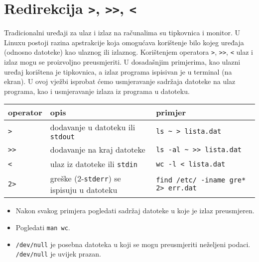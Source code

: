 \section{Redirekcija \lstinline!>!, \lstinline!>>!, \lstinline!<!}


Tradicionalni uređaji za ulaz i izlaz na računalima su tipkovnica i monitor. U Linuxu postoji razina apstrakcije koja omogućava korištenje bilo kojeg uređaja (odnosno datoteke) kao ulaznog ili izlaznog. Korištenjem operatora \lstinline!>!, \lstinline!>>!, \lstinline!<! ulaz i izlaz mogu se proizvoljno preusmjeriti. U dosadašnjim primjerima, kao ulazni uređaj korištena je tipkovnica, a izlaz programa ispisivan je u terminal (na ekran). U ovoj vježbi isprobat ćemo usmjeravanje sadržaja datoteke na ulaz programa, kao i usmjeravanje izlaza iz programa u datoteku.

\begin{tabularx}{\textwidth}{lXl}
\hline
operator & opis & primjer\\
\hline
\lstinline!>! & dodavanje u datoteku ili \texttt{stdout} &  \lstinline!ls ~ > lista.dat!\\
\lstinline!>>! & dodavanje na kraj datoteke & \lstinline!ls -al ~ >> lista.dat!\\
\lstinline!<! & ulaz iz datoteke ili \texttt{stdin} & \lstinline!wc -l < lista.dat!\\ 
\lstinline!2>! & greške (2-\texttt{stderr}) se ispisuju u datoteku & \lstinline!find /etc/ -iname gre* 2> err.dat!\\
\hline
\end{tabularx}

\begin{itemize}
 \item Nakon svakog primjera pogledati sadržaj datoteke u koje je izlaz preusmjeren. 
 \item Pogledati \lstinline!man wc!.
 \item \lstinline!/dev/null! je posebna datoteka u koji se mogu preusmjeriti neželjeni podaci. \lstinline!/dev/null! je uvijek prazan.\\
\end{itemize}

